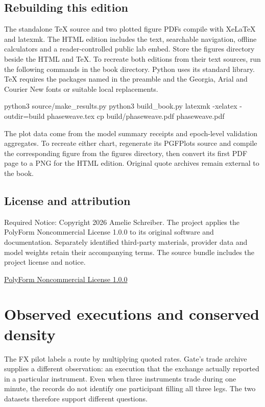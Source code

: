 \documentclass[11pt,oneside,openany]{book}
\newcommand{\bookdivision}{Chapter}
\begin{document}
\section*{Rebuilding this edition}
The standalone TeX source and two plotted figure PDFs compile with XeLaTeX and latexmk. The HTML edition includes the text, searchable navigation, offline calculators and a reader-controlled public lab embed. Store the figures directory beside the HTML and TeX. To recreate both editions from their text sources, run the following commands in the book directory. Python uses its standard library. TeX requires the packages named in the preamble and the Georgia, Arial and Courier New fonts or suitable local replacements.

\begin{BookCode}
python3 source/make_results.py
python3 build_book.py
latexmk -xelatex -outdir=build phaseweave.tex
cp build/phaseweave.pdf phaseweave.pdf
\end{BookCode}
The plot data come from the model summary receipts and epoch-level validation aggregates. To recreate either chart, regenerate its PGFPlots source and compile the corresponding figure from the figures directory, then convert its first PDF page to a PNG for the HTML edition. Original quote archives remain external to the book.

\section*{License and attribution}
Required Notice: Copyright 2026 Amelie Schreiber. The project applies the PolyForm Noncommercial License 1.0.0 to its original software and documentation. Separately identified third-party materials, provider data and model weights retain their accompanying terms. The source bundle includes the project license and notice.

{\small\sffamily\href{https://polyformproject.org/licenses/noncommercial/1.0.0/}{PolyForm Noncommercial License 1.0.0}\par}
\appendix\renewcommand{\bookdivision}{Appendix}
\chapter{Observed executions and conserved density}
The FX pilot labels a route by multiplying quoted rates. Gate’s trade archive supplies a different observation: an execution that the exchange actually reported in a particular instrument. Even when three instruments trade during one minute, the records do not identify one participant filling all three legs. The two datasets therefore support different questions.
\end{document}
